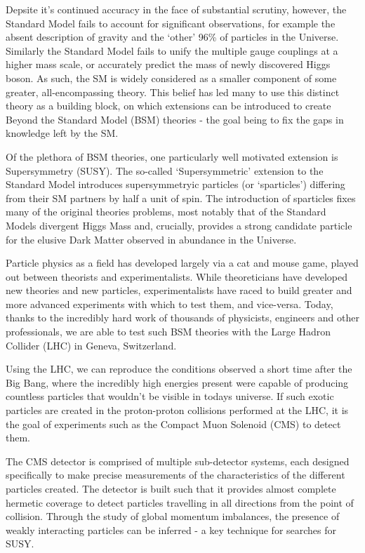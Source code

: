Depsite it's continued accuracy in the face of substantial scrutiny, however,
the Standard Model fails to account for significant observations, for example
the absent description of gravity and the `other' 96\% of particles in the
Universe. Similarly the Standard Model fails to unify the multiple gauge
couplings at a higher mass scale, or accurately predict the mass of newly
discovered Higgs boson. As such, the SM is widely considered
as a smaller component of some greater, all-encompassing theory.
This belief has led many to use this distinct theory as a building
block, on which extensions can be introduced to create Beyond the Standard Model
(BSM) theories - the goal being to fix the gaps in knowledge left by the SM.

Of the plethora of BSM theories, one particularly well motivated extension is
Supersymmetry (SUSY). The so-called `Supersymmetric' extension to the Standard
Model introduces supersymmetryic particles (or `sparticles') differing from
their SM partners by half a unit of spin. The introduction of sparticles fixes
many of the original theories problems, most notably that of the
Standard Models divergent Higgs Mass and, crucially, provides a strong
candidate particle for the elusive Dark Matter observed in abundance in the
Universe.

Particle physics as a field has developed largely via a cat and mouse game,
played out between theorists and experimentalists. While theoreticians have
developed new theories and new particles, experimentalists have raced to build
greater and more advanced experiments with which to test them, and vice-versa.
Today, thanks to the incredibly hard work of thousands of physicists, engineers
and other professionals, we are able to test such BSM theories with the Large
Hadron Collider (LHC) in Geneva, Switzerland.

Using the LHC, we can reproduce the conditions observed a short time
after the Big Bang, where the incredibly high energies present were capable of
producing countless particles that wouldn't be visible in todays universe. If
such exotic particles are created in the proton-proton collisions performed at
the LHC, it is the goal of experiments such as the Compact Muon Solenoid (CMS)
to detect them.

The CMS detector is comprised of multiple sub-detector systems, each designed
specifically to make precise measurements of the characteristics of the
different particles created. The detector is built such that it provides almost
complete hermetic coverage to detect particles travelling in all directions
from the point of collision. Through the study of global momentum imbalances,
the presence of weakly interacting particles can be inferred - a key technique
for searches for SUSY.

